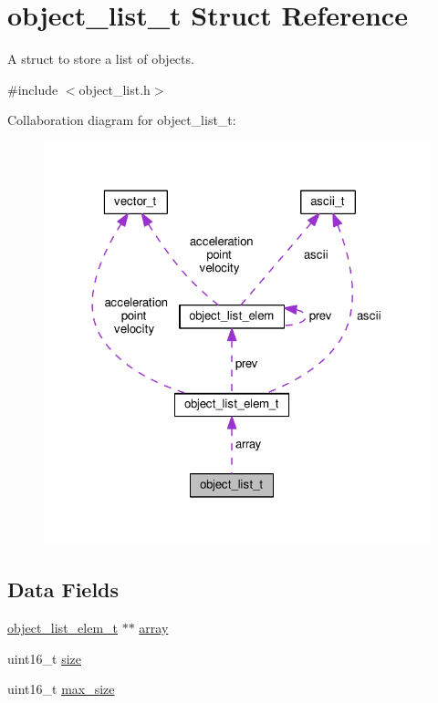 \hypertarget{structobject__list__t}{}\section{object\+\_\+list\+\_\+t Struct Reference}
\label{structobject__list__t}


A struct to store a list of objects.  




{\ttfamily \#include $<$object\+\_\+list.\+h$>$}



Collaboration diagram for object\+\_\+list\+\_\+t\+:\nopagebreak
\begin{figure}[H]
\begin{center}
\leavevmode
\includegraphics[width=322pt]{structobject__list__t__coll__graph}
\end{center}
\end{figure}
\subsection*{Data Fields}
\begin{DoxyCompactItemize}
\item 
\hyperlink{structobject__list__elem__t}{object\+\_\+list\+\_\+elem\+\_\+t} $\ast$$\ast$ \hyperlink{structobject__list__t_ab19231a7f3b4249002106ac152822819}{array}
\item 
uint16\+\_\+t \hyperlink{structobject__list__t_af656fe571a2562c31ae1ac9ebd4d7e79}{size}
\item 
uint16\+\_\+t \hyperlink{structobject__list__t_a577a0a7f314f10c0ffdd911f8b5a45f3}{max\+\_\+size}
\end{DoxyCompactItemize}


